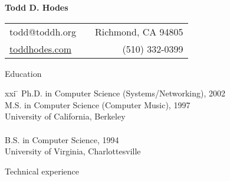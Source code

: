 \setlength{\oddsidemargin}{0in}
\setlength{\evensidemargin}{0 in}
\setlength{\topmargin}{-0.95 in}
\setlength{\textwidth}{6.5 in}
\setlength{\textheight}{9.6 in}
\setlength{\headsep}{0.35 in}
\setlength{\parindent}{0 in}
\setlength{\parskip}{0.05 in}


\addtolength{\evensidemargin}{-15pt}
\addtolength{\oddsidemargin}{-15pt}

\pagestyle{empty}


\begin{center} \bf
\Large
                               Todd D. Hodes
\medskip
\normalsize


\begin{tabular}{lp{3.75in}r}
 todd@toddh.org   & & Richmond, CA 94805   \\
 \url{toddhodes.com} & &(510)  332-0399 \\
\end{tabular}


\end{center}

\bigskip


\begin{bf} \large
Education \\[-18pt]
\end{bf}

\begin{tabbing}
xxi \= \kill
\>   Ph.D. in Computer Science (Systems/Networking), 2002  \\
\>   M.S. in Computer Science (Computer Music), 1997  \\
\>   University of California, Berkeley  \\
\smallskip \\[-6pt]
\>   B.S. in Computer Science, 1994 \\
\>   University of Virginia, Charlottesville \\
\end{tabbing}


\begin{bf} \large
Technical experience  \\[-16pt]
\end{bf}

